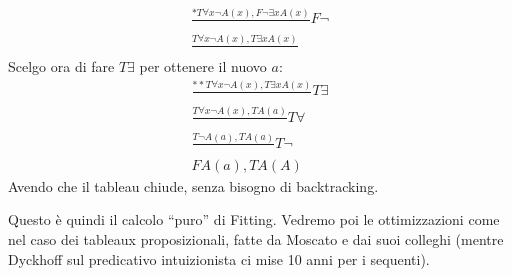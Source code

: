 \documentclass[a4paper,12pt, oneside]{book}
\begin{document}
\begin{esempio}
  \begin{gather*}
    \frac{*T\forall x\neg A(x), F\neg\exists x A(x)}{}F\neg\\
    \frac{T\forall x\neg A(x), T\exists xA(x)}{}
  \end{gather*}
  Scelgo ora di fare $T\exists$ per ottenere il nuovo $a$:
  \begin{gather*}
    \frac{**T\forall x\neg A(x), T\exists xA(x)}{}T\exists\\
    \frac{T\forall x\neg A(x), TA(a)}{}T\forall\\
    \frac{T\neg A(a), TA(a)}{}T\neg\\
    FA(a), TA(A)
  \end{gather*}
  Avendo che il tableau chiude, senza bisogno di backtracking.
\end{esempio}
Questo è quindi il calcolo ``puro'' di Fitting. Vedremo poi le ottimizzazioni
come nel caso dei tableaux proposizionali, fatte da Moscato e dai suoi colleghi
(mentre Dyckhoff sul predicativo intuizionista ci mise 10 anni per i sequenti).
\end{document}
